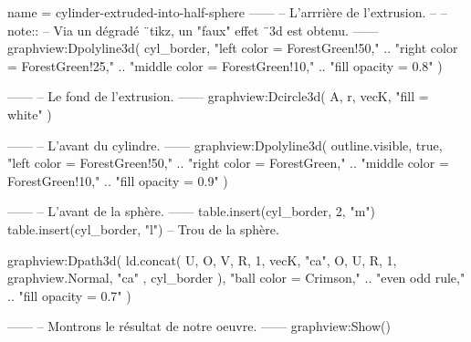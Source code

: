 \documentclass{standalone}
\begin{document}
\begin{luadraw*}{name = cylinder-extruded-into-half-sphere}
------
-- L'arrrière de l'extrusion.
--
-- note::
--     Via un dégradé ¨tikz, un "faux" effet ¨3d est obtenu.
------
graphview:Dpolyline3d(
  cyl_border,
     "left color = ForestGreen!50,"
  .. "right color = ForestGreen!25,"
  .. "middle color = ForestGreen!10,"
  .. "fill opacity = 0.8"
)

------
-- Le fond de l'extrusion.
------
graphview:Dcircle3d(
  A, r, vecK,
  "fill = white"
)

------
-- L'avant du cylindre.
------
graphview:Dpolyline3d(
  outline.visible,
  true,
     "left color = ForestGreen!50,"
  .. "right color = ForestGreen,"
  .. "middle color = ForestGreen!10,"
  .. "fill opacity = 0.9"
)

------
-- L'avant de la sphère.
------
table.insert(cyl_border, 2, "m")
table.insert(cyl_border, "l") -- Trou de la sphère.

graphview:Dpath3d(
  ld.concat(
    {
      U, O, V, R, 1, vecK, "ca",
      O, U, R, 1, graphview.Normal, "ca"
    },
    cyl_border
  ),
     "ball color = Crimson,"
  .. "even odd rule,"
  .. "fill opacity = 0.7"
)

------
-- Montrons le résultat de notre oeuvre.
------
graphview:Show()
\end{luadraw*}
\end{document}
